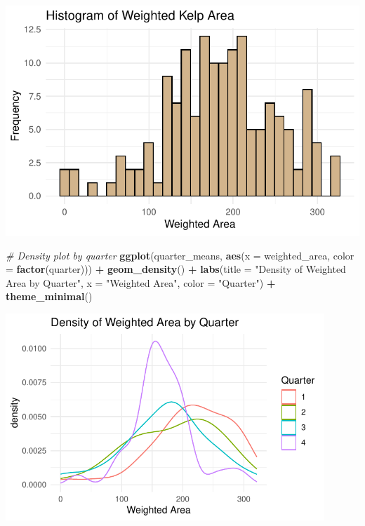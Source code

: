 \documentclass[
  british,
  10pt,
]{article}
\newenvironment{Shaded}{\begin{snugshade}}{\end{snugshade}}
\newcommand{\AttributeTok}[1]{\textcolor[rgb]{0.13,0.29,0.53}{#1}}
\newcommand{\CommentTok}[1]{\textcolor[rgb]{0.56,0.35,0.01}{\textit{#1}}}
\newcommand{\FunctionTok}[1]{\textcolor[rgb]{0.13,0.29,0.53}{\textbf{#1}}}
\newcommand{\NormalTok}[1]{#1}
\newcommand{\SpecialCharTok}[1]{\textcolor[rgb]{0.81,0.36,0.00}{\textbf{#1}}}
\newcommand{\StringTok}[1]{\textcolor[rgb]{0.31,0.60,0.02}{#1}}
\begin{document}
\begin{center}
\includegraphics[width=0.6\linewidth,height=\textheight,keepaspectratio]{BCB744_Biostats_Prac_Exam_2025_files/figure-pdf/chunk9-3.pdf}
\end{center}

\begin{Shaded}
\begin{Highlighting}[]
\CommentTok{\# Density plot by quarter}
\FunctionTok{ggplot}\NormalTok{(quarter\_means, }\FunctionTok{aes}\NormalTok{(}\AttributeTok{x =}\NormalTok{ weighted\_area, }\AttributeTok{color =} \FunctionTok{factor}\NormalTok{(quarter))) }\SpecialCharTok{+}
  \FunctionTok{geom\_density}\NormalTok{() }\SpecialCharTok{+}
  \FunctionTok{labs}\NormalTok{(}\AttributeTok{title =} \StringTok{"Density of Weighted Area by Quarter"}\NormalTok{,}
       \AttributeTok{x =} \StringTok{"Weighted Area"}\NormalTok{, }\AttributeTok{color =} \StringTok{"Quarter"}\NormalTok{) }\SpecialCharTok{+}
  \FunctionTok{theme\_minimal}\NormalTok{()}
\end{Highlighting}
\end{Shaded}

\begin{center}
\includegraphics[width=12cm,height=\textheight,keepaspectratio]{BCB744_Biostats_Prac_Exam_2025_files/figure-pdf/chunk9-4.pdf}
\end{center}
\end{document}
